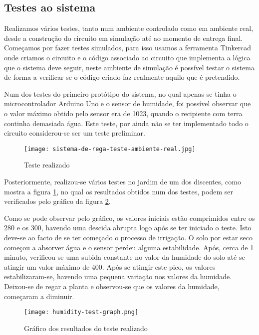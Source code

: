\documentclass[conference]{IEEEtran}
\begin{document}
\subsection{Testes ao sistema}

Realizamos vários testes, tanto num ambiente controlado como em ambiente real, desde
a construção do circuito em simulação até ao momento de entrega final. Começamos
por fazer testes simulados, para isso usamos a ferramenta Tinkercad \cite{tinkercad} onde
criamos o circuito e o código associado ao circuito que implementa a lógica
que o sistema deve seguir, neste ambiente de simulação é possível testar
o sistema de forma a verificar se o código criado faz realmente aquilo
que é pretendido.

Num dos testes do primeiro protótipo do sistema, no qual apenas se tinha o microcontrolador
Arduino Uno e o sensor de humidade, foi possível observar que o valor máximo obtido pelo sensor
era de 1023, quando o recipiente com terra continha demasiada água. Este teste, por ainda
não se ter implementado todo o circuito considerou-se ser um teste preliminar.

\begin{figure}[h]
    \centering
    \texttt{[image: sistema-de-rega-teste-ambiente-real.jpg]}
    \caption{Teste realizado}
    \label{fig:teste}
\end{figure}

Posteriormente, realizou-se vários testes no jardim de um dos discentes, como mostra a figura \ref{fig:teste},
no qual os resultados obtidos num dos testes, podem ser verificados pelo gráfico da figura \ref{fig:graphic}.

Como se pode observar pelo gráfico, os valores iniciais estão comprimidos entre os 280 e os 300,
havendo uma descida abrupta logo após se ter iniciado o teste. Isto deve-se ao facto de se ter começado
o processo de irrigação. O solo por estar seco começou a absorver água e o sensor perdeu alguma estabilidade.
Após, cerca de 1 minuto, verificou-se uma subida constante no valor da humidade do solo até se atingir
um valor máximo de 400. Após se atingir este pico, os valores estabilizaram-se, havendo uma pequena variação
nos valores da humidade. Deixou-se de regar a planta e observou-se que os valores da humidade, começaram
a diminuir.

\begin{figure}
    \centering
    \texttt{[image: humidity-test-graph.png]}
    \caption{Gráfico dos resultados do teste realizado}
    \label{fig:graphic}
\end{figure}
\end{document}
